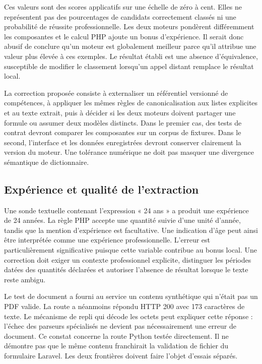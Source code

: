 Ces valeurs sont des scores applicatifs sur une échelle de zéro à cent. Elles ne représentent pas des pourcentages de candidats correctement classés ni une probabilité de réussite professionnelle. Les deux moteurs pondèrent différemment les composantes et le calcul PHP ajoute un bonus d'expérience. Il serait donc abusif de conclure qu'un moteur est globalement meilleur parce qu'il attribue une valeur plus élevée à ces exemples. Le résultat établi est une absence d'équivalence, susceptible de modifier le classement lorsqu'un appel distant remplace le résultat local.

La correction proposée consiste à externaliser un référentiel versionné de compétences, à appliquer les mêmes règles de canonicalisation aux listes explicites et au texte extrait, puis à décider si les deux moteurs doivent partager une formule ou assumer deux modèles distincts. Dans le premier cas, des tests de contrat devront comparer les composantes sur un corpus de fixtures. Dans le second, l'interface et les données enregistrées devront conserver clairement la version du moteur. Une tolérance numérique ne doit pas masquer une divergence sémantique de dictionnaire.

\subsection{Expérience et qualité de l'extraction}

Une sonde textuelle contenant l'expression « 24 ans » a produit une expérience de 24 années. La règle PHP accepte une quantité suivie d'une unité d'année, tandis que la mention d'expérience est facultative. Une indication d'âge peut ainsi être interprétée comme une expérience professionnelle. L'erreur est particulièrement significative puisque cette variable contribue au bonus local. Une correction doit exiger un contexte professionnel explicite, distinguer les périodes datées des quantités déclarées et autoriser l'absence de résultat lorsque le texte reste ambigu.

Le test de document a fourni au service un contenu synthétique qui n'était pas un PDF valide. La route a néanmoins répondu HTTP 200 avec 173 caractères de texte. Le mécanisme de repli qui décode les octets peut expliquer cette réponse : l'échec des parseurs spécialisés ne devient pas nécessairement une erreur de document. Ce constat concerne la route Python testée directement. Il ne démontre pas que le même contenu franchirait la validation de fichier du formulaire Laravel. Les deux frontières doivent faire l'objet d'essais séparés.

